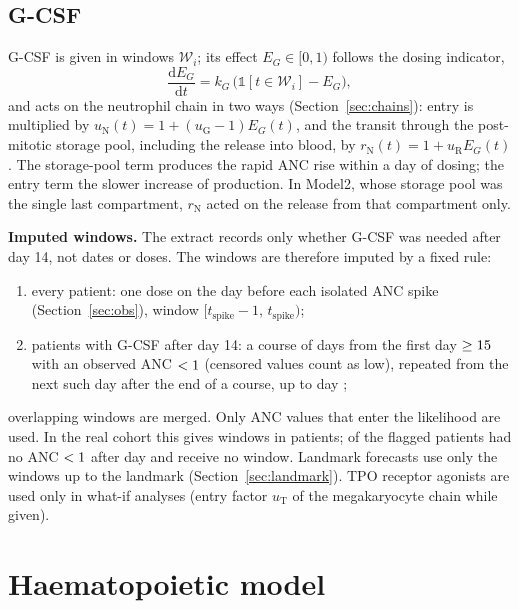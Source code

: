 \documentclass[11pt]{article}
\newcommand{\dd}{\mathrm{d}}
\newcommand{\one}{\mathbb{1}}
\begin{document}
\subsection{G-CSF}\label{sec:gcsf}
G-CSF is given in windows $\mathcal W_i$; its effect $E_G\in[0,1)$ follows the dosing indicator,
\begin{equation}
\frac{\dd E_G}{\dd t} = k_G\,\bigl(\one[t\in\mathcal W_i] - E_G\bigr), \label{eq:gcsf}
\end{equation}
and acts on the neutrophil chain in two ways (Section~\ref{sec:chains}): entry is multiplied by $u_{\mathrm{N}}(t)=1+(u_{\mathrm{G}}-1)E_G(t)$, and the transit through the post-mitotic storage pool, including the release into blood, by $r_{\mathrm{N}}(t)=1+u_{\mathrm{R}}E_G(t)$. The storage-pool term produces the rapid ANC rise within a day of dosing; the entry term the slower increase of production. In Model2, whose storage pool was the single last compartment, $r_{\mathrm{N}}$ acted on the release from that compartment only.

\textbf{Imputed windows.} The extract records only whether G-CSF was needed after day 14, not dates or doses. The windows are therefore imputed by a fixed rule:
\begin{enumerate}
\item every patient: one dose on the day before each isolated ANC spike (Section~\ref{sec:obs}), window $[t_{\mathrm{spike}}-1,\,t_{\mathrm{spike}})$;
\item patients with G-CSF after day 14: a course of \valGcsfDays{} days from the first day $\geq15$ with an observed ANC $<1$ (censored values count as low), repeated from the next such day after the end of a course, up to day \valGcsfUntil;
\end{enumerate}
overlapping windows are merged. Only ANC values that enter the likelihood are used. In the real cohort this gives \valGcsfWin{} windows in \valGcsfPts{} patients; \valGcsfNoWin{} of the \valGcsfFlagged{} flagged patients had no ANC $<1$ after day \valGcsfFrom{} and receive no window. Landmark forecasts use only the windows up to the landmark (Section~\ref{sec:landmark}). TPO receptor agonists are used only in what-if analyses (entry factor $u_{\mathrm{T}}$ of the megakaryocyte chain while given).

\section{Haematopoietic model}\label{sec:haem}
\end{document}
